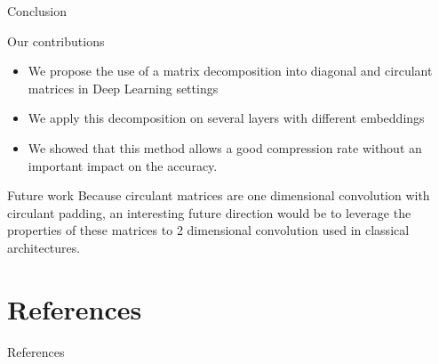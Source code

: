 \documentclass[9pt]{beamer}
\begin{document}
\begin{frame}{Conclusion}

\begin{block}{Our contributions}
\begin{itemize}
\item We propose the use of a matrix decomposition into diagonal and circulant matrices in Deep Learning settings
\item We apply this decomposition on several layers with different embeddings
\item We showed that this method allows a good compression rate without an important impact on the accuracy. 
\end{itemize}
\end{block}

\begin{block}{Future work}
    Because circulant matrices are one dimensional convolution with circulant padding, an interesting future direction would be to leverage the properties of these matrices to 2 dimensional convolution used in classical architectures. 
\end{block}


\end{frame}


\section{References}
\begin{frame}{References}


\end{frame}
\end{document}
